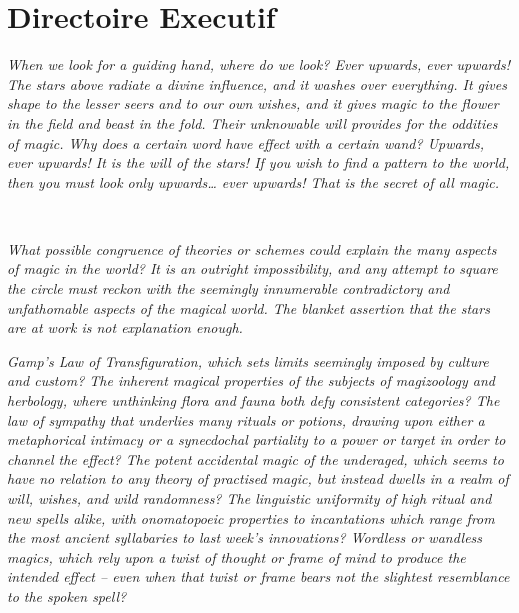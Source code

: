 \hypertarget{directoire-executif}{%
\chapter{Directoire Executif}\label{directoire-executif}}

\emph{When we look for a guiding hand, where do we look? Ever upwards,
ever upwards! The stars above radiate a divine influence, and it washes
over everything. It gives shape to the lesser seers and to our own
wishes, and it gives magic to the flower in the field and beast in the
fold. Their unknowable will provides for the oddities of magic. Why does
a certain word have effect with a certain wand? Upwards, ever upwards!
It is the will of the stars! If you wish to find a pattern to the world,
then you must look only upwards\ldots{} ever upwards! That is the secret
of all magic.}

\\

\mybreak

\emph{What possible congruence of theories or schemes could explain the
many aspects of magic in the world? It is an outright impossibility, and
any attempt to square the circle must reckon with the seemingly
innumerable contradictory and unfathomable aspects of the magical world.
The blanket assertion that the stars are at work is not explanation
enough.}

\emph{Gamp's Law of Transfiguration, which sets limits seemingly imposed
by culture and custom? The inherent magical properties of the subjects
of magizoology and herbology, where unthinking flora and fauna both defy
consistent categories? The law of sympathy that underlies many rituals
or potions, drawing upon either a metaphorical intimacy or a synecdochal
partiality to a power or target in order to channel the effect? The
potent accidental magic of the underaged, which seems to have no
relation to any theory of practised magic, but instead dwells in a realm
of will, wishes, and wild randomness? The linguistic uniformity of high
ritual and new spells alike, with onomatopoeic properties to
incantations which range from the most ancient syllabaries to last
week's innovations? Wordless or wandless magics, which rely upon a twist
of thought or frame of mind to produce the intended effect -- even when
that twist or frame bears not the slightest resemblance to the spoken
spell?}


